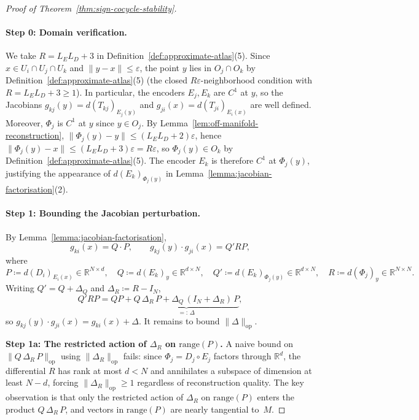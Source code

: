\documentclass[11pt]{article}
\newcommand{\R}{\mathbb{R}}
\theoremstyle{plain}
\theoremstyle{definition}
\theoremstyle{remark}
\begin{document}
\begin{appendices}
\begin{proof}[Proof of Theorem~\ref{thm:sign-cocycle-stability}]
\paragraph{Step 0: Domain verification.}
We take $R=L_E L_D + 3$ in Definition~\ref{def:approximate-atlas}(5). Since $x \in U_i \cap U_j \cap U_k$ and $\|y - x\| \leq \varepsilon$, the point $y$ lies in $O_j \cap O_k$ by Definition~\ref{def:approximate-atlas}(5) (the closed $R\varepsilon$-neighborhood condition with $R = L_E L_D + 3 \geq 1$). In particular, the encoders $E_j, E_k$ are $C^1$ at $y$, so the Jacobians $g_{kj}(y) = d(T_{kj})_{E_j(y)}$ and $g_{ji}(x) = d(T_{ji})_{E_i(x)}$ are well defined. Moreover, $\Phi_j$ is $C^1$ at $y$ since $y \in O_j$. By Lemma~\ref{lem:off-manifold-reconstruction}, $\|\Phi_j(y) - y\| \leq (L_E L_D + 2)\varepsilon$, hence $\|\Phi_j(y) - x\| \leq (L_E L_D + 3)\varepsilon = R\varepsilon$, so $\Phi_j(y) \in O_k$ by Definition~\ref{def:approximate-atlas}(5). The encoder $E_k$ is therefore $C^1$ at $\Phi_j(y)$, justifying the appearance of $d(E_k)_{\Phi_j(y)}$ in Lemma~\ref{lemma:jacobian-factorisation}(2).

\paragraph{Step 1: Bounding the Jacobian perturbation.}
By Lemma~\ref{lemma:jacobian-factorisation},
\[
g_{ki}(x) = Q \cdot P, \qquad g_{kj}(y) \cdot g_{ji}(x) = Q' R P,
\]
where
\[
P \coloneqq d(D_i)_{E_i(x)} \in \R^{N \times d}, \quad
Q \coloneqq d(E_k)_y \in \R^{d \times N}, \quad
Q' \coloneqq d(E_k)_{\Phi_j(y)} \in \R^{d \times N}, \quad
R \coloneqq d(\Phi_j)_y \in \R^{N \times N}.
\]
Writing $Q' = Q + \Delta_Q$ and $\Delta_R \coloneqq R - I_N$,
\begin{equation}\label{eq:Delta-decomposition}
Q'RP = QP + \underbrace{Q\,\Delta_R\, P + \Delta_Q\,(I_N + \Delta_R)\,P}_{=:\,\Delta},
\end{equation}
so $g_{kj}(y) \cdot g_{ji}(x) = g_{ki}(x) + \Delta$. It remains to bound $\|\Delta\|_{\mathrm{op}}$.

\medskip

\textbf{Step 1a: The restricted action of $\Delta_R$ on $\mathrm{range}(P)$.}
A naive bound on $\|Q\,\Delta_R\,P\|_{\mathrm{op}}$ using $\|\Delta_R\|_{\mathrm{op}}$ fails: since $\Phi_j = D_j \circ E_j$ factors through $\R^d$, the differential $R$ has rank at most $d < N$ and annihilates a subspace of dimension at least $N - d$, forcing $\|\Delta_R\|_{\mathrm{op}} \geq 1$ regardless of reconstruction quality. The key observation is that only the restricted action of $\Delta_R$ on $\mathrm{range}(P)$ enters the product $Q\,\Delta_R\,P$, and vectors in $\mathrm{range}(P)$ are nearly tangential to~$M$.


\end{proof}
\end{appendices}
\end{document}
